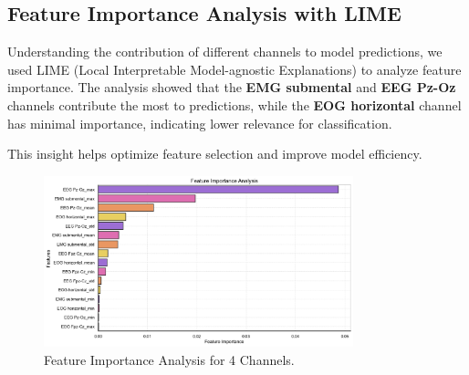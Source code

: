 \subsection{Feature Importance Analysis with LIME}

Understanding the contribution of different channels to model predictions, we used LIME (Local Interpretable Model-agnostic Explanations) to analyze feature importance. The analysis showed that the \textbf{EMG submental} and \textbf{EEG Pz-Oz} channels contribute the most to predictions, while the \textbf{EOG horizontal} channel has minimal importance, indicating lower relevance for classification.

This insight helps optimize feature selection and improve model efficiency.

\begin{figure}[h!]
    \centering
    \includegraphics[width=0.8\textwidth]{img/feature importance chanels analysis.png}
    \caption{Feature Importance Analysis for 4 Channels.}
\end{figure}
